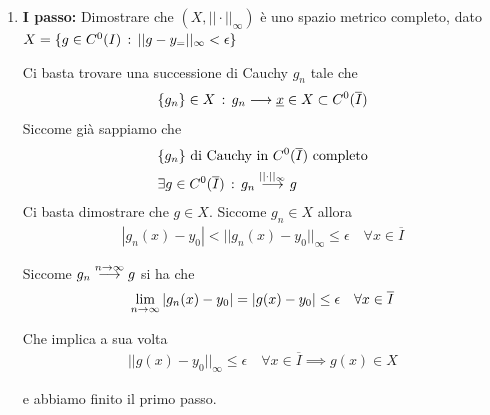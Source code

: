 \begin{enumerate}
	\item \textbf{I passo:} Dimostrare che $(X,||\cdot||_\infty)$ è uno spazio metrico completo, dato $X= \{g\in C^0(I) \, : \, ||g-y_=||_\infty <\epsilon\}$
	
	Ci basta trovare una successione di Cauchy $g_n$ tale che 
	\begin{align}
		\{g_n\} \in X \, : \, g_n \longrightarrow \underline{x} \in X \subset C^0(\overline{I})
	\end{align}
	Siccome già sappiamo che 
	\begin{align}
		{}&\{g_n\} \text{ di Cauchy in } C^0(\overline{I}) \text{ completo}\\	
		&\exists g \in C^0(\overline{I}) \, : \, g_n
		\overset{||\cdot||_\infty}{\longrightarrow} g
	\end{align}
	Ci basta dimostrare che $g\in X$. Siccome $g_n \in  X$ allora
	\begin{align}
		| g_n(x) - y_0| < || g_n(x) - y_0||_\infty \leq \epsilon \quad \forall x \in \overline{I}
	\end{align}
	
	Siccome $g_n \overset{n \rightarrow \infty}{\longrightarrow} g$ si ha che 
	\begin{align}
		\underset{n \rightarrow \infty}{\lim} \,| g_n(x) - y_0| = | g(x) - y_0|\leq \epsilon \quad \forall x \in \overline{I}
	\end{align}
	
	Che implica a sua volta
	\begin{align}
		|| g(x) - y_0||_\infty\leq \epsilon \quad \forall x \in \overline{I} \implies g(x)\in X
	\end{align}
	
	e abbiamo finito il primo passo.
	

\end{enumerate}
